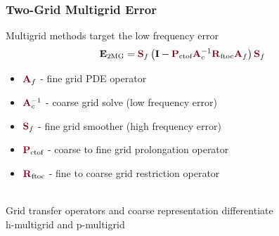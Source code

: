 \documentclass{beamer}
\begin{document}
\begin{frame}
\begin{center}
\frametitle{Two-Grid Multigrid Error}

Multigrid methods target the low frequency error\\

\begin{equation}
\mathbf{E}_{\text{2MG}} = {\color{burgundy}\mathbf{S}}_f \left( \mathbf{I} - {\color{burgundy}\mathbf{P}}_{\text{ctof}} {\color{burgundy}\mathbf{A}}_c^{-1} {\color{burgundy}\mathbf{R}}_{\text{ftoc}} {\color{burgundy}\mathbf{A}}_f \right) {\color{burgundy}\mathbf{S}}_f
\end{equation}

\begin{itemize}

\item ${\color{burgundy}\mathbf{A}}_f$ - fine grid PDE operator

\item ${\color{burgundy}\mathbf{A}}_c^{-1}$ - coarse grid solve (low frequency error)

\item ${\color{burgundy}\mathbf{S}}_f$ - fine grid smoother (high frequency error)

\item ${\color{burgundy}\mathbf{P}}_{\text{ctof}}$ - coarse to fine grid prolongation operator

\item ${\color{burgundy}\mathbf{R}}_{\text{ftoc}}$ - fine to coarse grid restriction operator

\end{itemize}

~\\

Grid transfer operators and coarse representation differentiate\\h-multigrid and p-multigrid

\end{center}
\end{frame}

\end{document}

